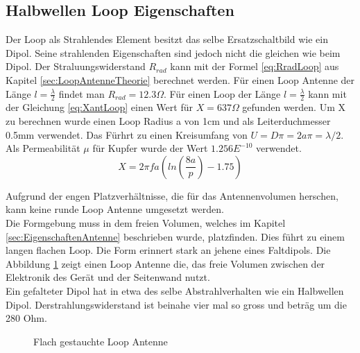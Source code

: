 \subsection{Halbwellen Loop Eigenschaften}
Der Loop als Strahlendes Element besitzt das selbe Ersatzschaltbild wie ein Dipol. Seine strahlenden Eigenschaften sind jedoch nicht die gleichen wie beim Dipol. Der Straluungswiderstand $R_{rad}$ kann mit der Formel \ref{eq:RradLoop} aus Kapitel \ref{sec:LoopAntenneTheorie} berechnet werden. Für einen Loop Antenne der Länge $l=\frac{\lambda}{2}$ findet man $R_{rad} = 12.3\Omega$. Für einen Loop der Länge $l=\frac{\lambda}{2}$ kann mit der Gleichung \ref{eq:XantLoop} einen Wert für $X = 637 \Omega$ gefunden werden. Um X zu berechnen wurde einen Loop Radius a von 1cm und als Leiterduchmesser 0.5mm verwendet. Das Fürhrt zu einen Kreisumfang von $U=D\pi=2a\pi=\lambda /2$. Als Permeabilität $\mu $ für Kupfer wurde der Wert $1.256E^{-10}$ verwendet.
\begin{equation}\label{eq:XantLoop}
X= 2\pi f a(ln \left( \frac{8a}{p} \right) - 1.75)
\end{equation}

Aufgrund der engen Platzverhältnisse, die für das Antennenvolumen herschen, kann keine runde Loop Antenne umgesetzt werden. \\
Die Formgebung muss in dem freien Volumen, welches im Kapitel \ref{sec:EigenschaftenAntenne} beschrieben wurde, platzfinden. Dies führt zu einem langen flachen Loop. Die Form erinnert stark an jehene eines Faltdipols. Die Abbildung \ref{fig:FflacheLoopAntenne} zeigt einen Loop Antenne die, das freie Volumen zwischen der Elektronik des Gerät und der Seitenwand nutzt.\\
 Ein gefalteter Dipol hat in etwa des selbe Abstrahlverhalten wie ein Halbwellen Dipol. Derstrahlungswiderstand ist beinahe vier mal so gross und beträg um die 280 Ohm. 
\begin{figure}[h]
	\begin{center}
	\end{center}
\caption{Flach gestauchte Loop Antenne}
\label{fig:FflacheLoopAntenne}
\end{figure}

